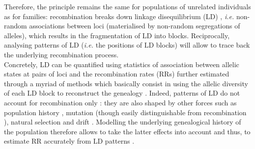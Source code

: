 Therefore, the principle remains the same for populations of unrelated individuals as for families: recombination breaks down linkage disequilibrium (LD) \citep{lewontin1960evolutionary}, \textit{i.e.} non-random associations between loci (materialised by non-random segregations of alleles), which results in the fragmentation of LD into blocks.
Reciprocally, analysing patterns of LD (\textit{i.e.} the positions of LD blocks) will allow to trace back the underlying recombination process.\\

Concretely, LD can be quantified using statistics of association between allelic states at pairs of loci \citep{lewontin1964interaction,hill1968linkage} and the recombination rates (RRs) further estimated through a myriad of methods \citep[reviewed in][]{stumpf2003estimating} which basically consist in using the allelic diversity of each LD block to reconstruct the genealogy \citep[reviewed in][]{hinch2013landscape}.
Indeed, patterns of LD do not account for recombination only \citep[reviewed in][]{venn2013inferring}: they are also shaped by other forces such as population history \citep{golding1984sampling}, mutation \citep{calafell2001haplotype} (though easily distinguishable from recombination \citep{hudson1985statistical}), natural selection \citep{barton2000genetic} and drift \citep{charlesworth1997effects}. 
Modelling the underlying genealogical history of the population therefore allows to take the latter effects into account and thus, to estimate RR accurately from LD patterns \citep{stumpf2003estimating}.\\

